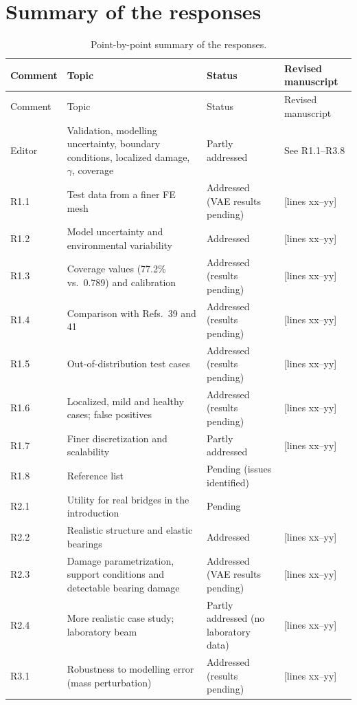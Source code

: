 \documentclass[11pt]{article}
\newcommand{\tbd}[1]{\textcolor{note}{\textsf{[#1]}}}
\newcommand{\lines}[1]{\tbd{lines #1}}
\begin{document}
\section{Summary of the responses}
{\small
\begin{longtable}{p{1.55cm}p{6.0cm}p{3.0cm}p{3.6cm}}
\caption{Point-by-point summary of the responses.}\label{tab:summary}\\
\toprule
Comment & Topic & Status & Revised manuscript \\
\midrule
\endfirsthead
\toprule
Comment & Topic & Status & Revised manuscript \\
\midrule
\endhead
Editor & Validation, modelling uncertainty, boundary conditions, localized damage, $\gamma$, coverage & Partly addressed & See R1.1--R3.8 \\
R1.1 & Test data from a finer FE mesh & Addressed (VAE results pending) & \lines{xx--yy} \\
R1.2 & Model uncertainty and environmental variability & Addressed & \lines{xx--yy} \\
R1.3 & Coverage values (77.2\% vs.\ 0.789) and calibration & Addressed (results pending) & \lines{xx--yy} \\
R1.4 & Comparison with Refs.\ 39 and 41 & Addressed (results pending) & \lines{xx--yy} \\
R1.5 & Out-of-distribution test cases & Addressed (results pending) & \lines{xx--yy} \\
R1.6 & Localized, mild and healthy cases; false positives & Addressed (results pending) & \lines{xx--yy} \\
R1.7 & Finer discretization and scalability & Partly addressed & \lines{xx--yy} \\
R1.8 & Reference list & Pending (issues identified) & \\
R2.1 & Utility for real bridges in the introduction & Pending & \\
R2.2 & Realistic structure and elastic bearings & Addressed & \lines{xx--yy} \\
R2.3 & Damage parametrization, support conditions and detectable bearing damage & Addressed (VAE results pending) & \lines{xx--yy} \\
R2.4 & More realistic case study; laboratory beam & Partly addressed (no laboratory data) & \lines{xx--yy} \\
R3.1 & Robustness to modelling error (mass perturbation) & Addressed (results pending) & \lines{xx--yy} \\

\end{longtable}}
\end{document}
